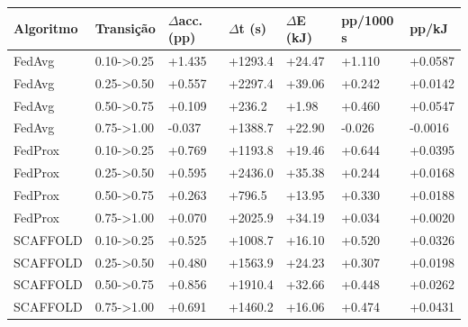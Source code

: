 \begin{tabular}{lllllll}
\toprule
Algoritmo & Transição & $\Delta$acc. (pp) & $\Delta$t (s) & $\Delta$E (kJ) & pp/1000 s & pp/kJ \\
\midrule
FedAvg & 0.10->0.25 & +1.435 & +1293.4 & +24.47 & +1.110 & +0.0587 \\
FedAvg & 0.25->0.50 & +0.557 & +2297.4 & +39.06 & +0.242 & +0.0142 \\
FedAvg & 0.50->0.75 & +0.109 & +236.2 & +1.98 & +0.460 & +0.0547 \\
FedAvg & 0.75->1.00 & -0.037 & +1388.7 & +22.90 & -0.026 & -0.0016 \\
FedProx & 0.10->0.25 & +0.769 & +1193.8 & +19.46 & +0.644 & +0.0395 \\
FedProx & 0.25->0.50 & +0.595 & +2436.0 & +35.38 & +0.244 & +0.0168 \\
FedProx & 0.50->0.75 & +0.263 & +796.5 & +13.95 & +0.330 & +0.0188 \\
FedProx & 0.75->1.00 & +0.070 & +2025.9 & +34.19 & +0.034 & +0.0020 \\
SCAFFOLD & 0.10->0.25 & +0.525 & +1008.7 & +16.10 & +0.520 & +0.0326 \\
SCAFFOLD & 0.25->0.50 & +0.480 & +1563.9 & +24.23 & +0.307 & +0.0198 \\
SCAFFOLD & 0.50->0.75 & +0.856 & +1910.4 & +32.66 & +0.448 & +0.0262 \\
SCAFFOLD & 0.75->1.00 & +0.691 & +1460.2 & +16.06 & +0.474 & +0.0431 \\
\bottomrule
\end{tabular}
